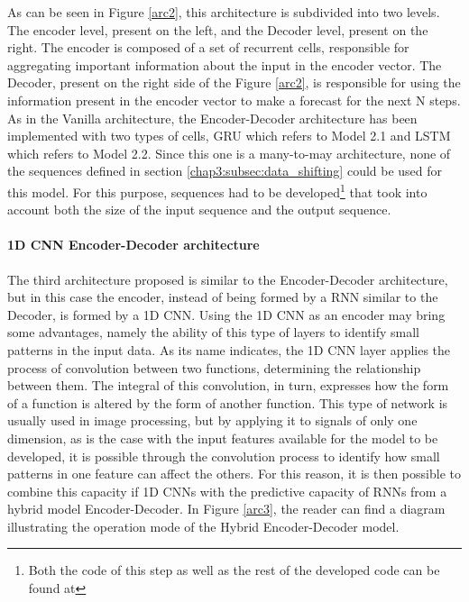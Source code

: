 As can be seen in Figure \ref{arc2}, this architecture is subdivided into two levels. The encoder level, present on the left, and the Decoder level, present on the right. The encoder is composed of a set of recurrent cells, responsible for aggregating important information about the input in the encoder vector. The Decoder, present on the right side of the Figure \ref{arc2}, is responsible for using the information present in the encoder vector to make a forecast for the next N steps. As in the Vanilla architecture, the Encoder-Decoder architecture has been implemented with two types of cells, \ac{GRU} which refers to Model 2.1 and \ac{LSTM} which refers to Model 2.2. Since this one is a many-to-may architecture, none of the sequences defined in section \ref{chap3:subsec:data_shifting} could be used for this model. For this purpose, sequences had to be developed\footnote{Both the code of this step as well as the rest of the developed code can be found at} that took into account both the size of the input sequence and the output sequence.



\paragraph{1D CNN Encoder-Decoder architecture}


The third architecture proposed is similar to the Encoder-Decoder architecture, but in this case the encoder, instead of being formed by a \ac{RNN} similar to the Decoder, is formed by a \ac{1D CNN}. Using the \ac{1D CNN} as an encoder may bring some advantages, namely the ability of this type of layers to identify small patterns in the input data.  As its name indicates, the \ac{1D CNN} layer applies the process of convolution between two functions, determining the relationship between them. The integral of this convolution, in turn, expresses how the form of a function is altered by the form of another function. This type of network is usually used in image processing, but by applying it to signals of only one dimension, as is the case with the input features available for the model to be developed, it is possible through the convolution process to identify how small patterns in one feature can affect the others. For this reason, it is then possible to combine this capacity if \ac{1D CNN}s with the predictive capacity of \ac{RNN}s from a hybrid model Encoder-Decoder. In Figure \ref{arc3}, the reader can find a diagram illustrating the operation mode of the Hybrid Encoder-Decoder model.

